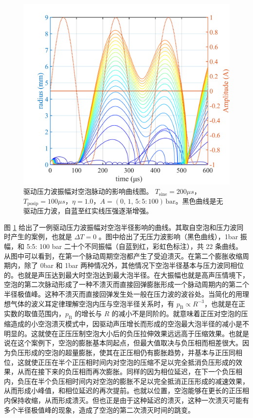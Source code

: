 \begin{figure}[H]
  \centering
  \includegraphics[width=0.7\linewidth]{img/fig5.26-eps-converted-to.pdf}
  \caption[驱动压力波振幅对空泡脉动的影响曲线图]{驱动压力波振幅对空泡脉动的影响曲线图。
$T_\mathrm{sine}=200 \mu s$，$T_\mathrm{posip}=100\mu s$，$\eta =1.0$，$A=(0,\, 1,\,5:5:100)\, \mathrm {bar}$。黑色曲线是无驱动压力波，自蓝至红实线压强逐渐增强。}
  \label{fig:5.26}
\end{figure}

图 \ref{fig:5.26} 
给出了一例驱动压力波振幅对空泡半径影响的曲线。其取自空泡和压力波同时产生的案例，也就是
$\Delta T= 0$ 。图中给出了无压力波影响（黑色曲线），1bar 振幅，和 5:5:
100 bar 二十个不同振幅（自蓝到红，彩虹色标注），共 22
条曲线。从图中可以看到，在第一个脉动周期空泡都产生了受迫溃灭。在第二个膨胀收缩周期内，除了
0bar 和 1bar
两种情况外，其他情况下空泡半径基本与压力波同相位的。也就是声压达到最大时空泡达到最大泡半径。在大振幅也就是高声压情境下，空泡的第二次脉动形成了一种不溃灭而直接回弹膨胀形成一个脉动周期内的第二个半径极值峰。这种不溃灭而直接回弹发生处一般在压力波的波谷处。当简化的用理想气体的波义耳定律理解空泡内压与空泡半径关系时，有
$p_\mathrm{B}\propto R^{-3}$，也就是在正实数的取值范围内，$p_\mathrm{B}$
的增长与 $R$
的减小不是同阶的。就意味着正压对空泡的压缩造成的小空泡溃灭模式中，因驱动声压增长而形成的空泡最大泡半径的减小是不明显的。这就使在正压压制空泡大小后的负压拉伸效果远远高于压缩效果。也就是说在这个案例下，空泡的膨胀基本同起点，但最大值取决与负压相而相差很大。因为负压形成的空泡的超量膨胀，使其在正压相仍有膨胀趋势，并基本与正压同相位，这就使正压在半个正压相时间内对空泡的压缩不足以完全抵消负压形成的效果，从而在接下来的负压相而再次膨胀。同样的因为相位延迟，在下一个负压相内，负压在半个负压相时间内对空泡的膨胀不足以完全抵消正压形成的减速效果，从而形成小峰值，和相位延迟的再次提前。也就以位置，空泡能够在更长的正压相内保持收缩，从而形成溃灭。但也正是由于这种延迟的溃灭，这种一次溃灭可能有多个半径极值峰的现象，造成了空泡的第二次溃灭时间的跳变。

